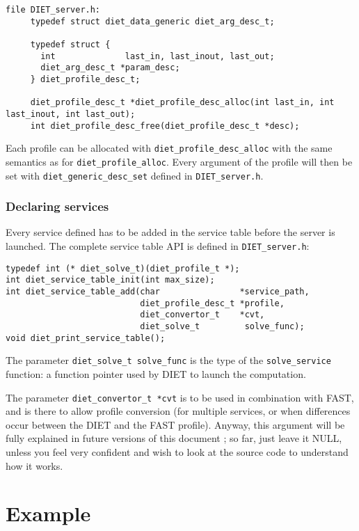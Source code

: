 {{{\begin{verbatim}
file DIET_server.h:
     typedef struct diet_data_generic diet_arg_desc_t;

     typedef struct {
       int              last_in, last_inout, last_out;
       diet_arg_desc_t *param_desc;
     } diet_profile_desc_t;

     diet_profile_desc_t *diet_profile_desc_alloc(int last_in, int last_inout, int last_out);
     int diet_profile_desc_free(diet_profile_desc_t *desc);
\end{verbatim}
}

Each profile can be allocated with \texttt{diet\_profile\_desc\_alloc} with the
same semantics as for \texttt{diet\_profile\_alloc}. Every argument of the
profile will then be set with \texttt{diet\_generic\_desc\_set} defined in
\texttt{DIET\_server.h}.

\subsubsection*{Declaring services}

Every service defined has to be added in the service table before the server is
launched. The complete service table API is defined in \texttt{DIET\_server.h}:
{\footnotesize
\begin{verbatim}
typedef int (* diet_solve_t)(diet_profile_t *);
int diet_service_table_init(int max_size);
int diet_service_table_add(char                *service_path,
                           diet_profile_desc_t *profile,
                           diet_convertor_t    *cvt,
                           diet_solve_t         solve_func);
void diet_print_service_table();
\end{verbatim}
}

The parameter \texttt{diet\_solve\_t solve\_func} is the type of the
\texttt{solve\_service} function: a function pointer used by DIET to launch the
computation.

The parameter \texttt{diet\_convertor\_t *cvt} is to be used in combination with
FAST, and is there to allow profile conversion (for multiple services, or when
differences occur between the DIET and the FAST profile). Anyway, this argument
will be fully explained in future versions of this document ; so far, just leave
it NULL, unless you feel very confident and wish to look at the source code to
understand how it works.


\section{Example}
\label{sec:sv_ex}

}}
